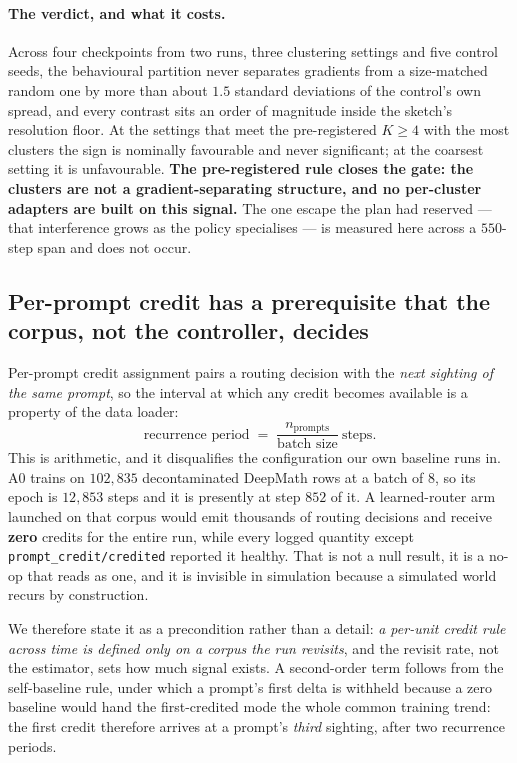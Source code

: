 \paragraph{The verdict, and what it costs.} Across four checkpoints from two runs, three
clustering settings and five control seeds, the behavioural partition never separates gradients
from a size-matched random one by more than about $1.5$ standard deviations of the control's own
spread, and every contrast sits an order of magnitude inside the sketch's resolution floor. At
the settings that meet the pre-registered $K\ge4$ with the most clusters the sign is nominally
favourable and never significant; at the coarsest setting it is unfavourable. \textbf{The
pre-registered rule closes the gate: the clusters are not a gradient-separating structure, and
no per-cluster adapters are built on this signal.} The one escape the plan had reserved --- that
interference grows as the policy specialises --- is measured here across a $550$-step span and
does not occur.

\subsection{Per-prompt credit has a prerequisite that the corpus, not the controller, decides}
\label{sec:recurrence}

Per-prompt credit assignment pairs a routing decision with the \emph{next sighting of the same
prompt}, so the interval at which any credit becomes available is a property of the data loader:
%
\begin{equation}
\text{recurrence period} \;=\; \frac{n_{\text{prompts}}}{\text{batch size}}\ \text{steps.}
\label{eq:recurrence}
\end{equation}
%
This is arithmetic, and it disqualifies the configuration our own baseline runs in. A0 trains on
$102{,}835$ decontaminated DeepMath rows at a batch of $8$, so its epoch is $12{,}853$ steps and
it is presently at step $852$ of it. A learned-router arm launched on that corpus would emit
thousands of routing decisions and receive \textbf{zero} credits for the entire run, while every
logged quantity except \texttt{prompt\_credit/credited} reported it healthy. That is not a null
result, it is a no-op that reads as one, and it is invisible in simulation because a simulated
world recurs by construction.

We therefore state it as a precondition rather than a detail: \emph{a per-unit credit rule across
time is defined only on a corpus the run revisits}, and the revisit rate, not the estimator, sets
how much signal exists. A second-order term follows from the self-baseline rule, under which a
prompt's first delta is withheld because a zero baseline would hand the first-credited mode the
whole common training trend: the first credit therefore arrives at a prompt's \emph{third}
sighting, after two recurrence periods.


